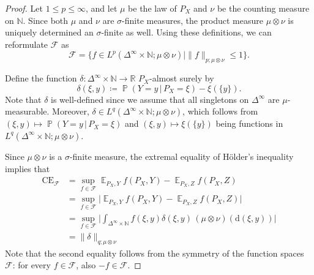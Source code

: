 \documentclass{article}
\DeclareMathOperator{\Prob}{\mathbb{P}}
\DeclareMathOperator{\Exp}{\mathbb{E}}
\begin{document}
\begin{proof}
    Let $1 \leq p \leq \infty$, and let $\mu$ be the law of $P_X$ and $\nu$ be the counting measure on $\mathbb{N}$.
    Since both $\mu$ and $\nu$ are $\sigma$-finite measures, the product measure $\mu \otimes \nu$ is uniquely
    determined an $\sigma$-finite as well. Using these definitions, we can reformulate $\mathcal{F}$ as
    \begin{equation*}
        \mathcal{F} =  \{f \in L^p(\Delta^\infty \times \mathbb{N}; \mu \otimes \nu) \mid \|f\|_{p; \mu \otimes \nu} \leq 1\}.
    \end{equation*}
    
    Define the function $\delta \colon \Delta^{\infty} \times \mathbb{N} \to \mathbb{R}$ $P_X$-almost
    surely by
    \begin{equation*}
        \delta(\xi, y) \coloneqq \Prob(Y = y \,|\, P_X = \xi) - \xi(\{y\}).
    \end{equation*}
    Note that $\delta$ is well-defined since we assume that all singletons on $\Delta^{\infty}$ are
    $\mu$-measurable. Moreover, $\delta \in L^q(\Delta^\infty \times \mathbb{N}; \mu \otimes \nu)$,
    which follows from $(\xi, y) \mapsto \Prob(Y = y \,|\, P_X = \xi)$
    and $(\xi, y) \mapsto \xi(\{y\})$ being functions in $L^q(\Delta^\infty \times \mathbb{N}; \mu \otimes \nu)$.
    
    
    Since $\mu \otimes \nu$ is a $\sigma$-finite measure, the extremal equality of Hölder's inequality implies that
    \begin{equation*}
        \begin{split}
            \mathrm{CE}_{\mathcal{F}} &= \sup_{f \in \mathcal{F}} \Exp_{P_X,Y} f(P_X,Y) - \Exp_{P_X,Z} f(P_X, Z) \\
            &= \sup_{f \in \mathcal{F}} \bigg| \Exp_{P_X,Y} f(P_X,Y) - \Exp_{P_X,Z} f(P_X, Z) \bigg| \\
            &= \sup_{f \in \mathcal{F}} \bigg| \int_{\Delta^{\infty} \times \mathbb{N}} f(\xi, y) \delta(\xi, y) \,(\mu \otimes \nu)(\mathrm{d}(\xi, y)) \bigg| \\
            &= \|\delta\|_{q;\mu \otimes \nu}
        \end{split}
    \end{equation*}
    Note that the second equality follows from the symmetry of the function spaces $\mathcal{F}$: for every $f \in \mathcal{F}$, also $-f \in \mathcal{F}$.


\end{proof}
\end{document}
